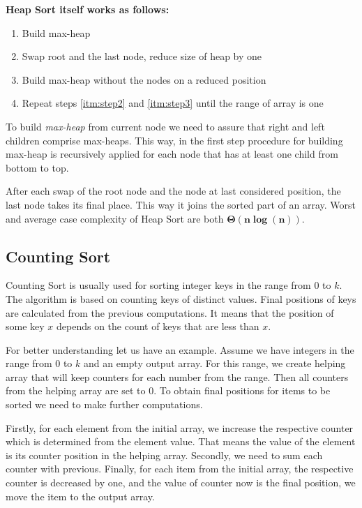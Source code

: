 \documentclass[
  field=inf,
  biblatex,
  language=english,
  glossaries,
  theorems=false,
  sourcecodes=false,
  index
]{kidiplom}
\begin{document}
\textbf{Heap Sort itself works as follows:}
\begin{enumerate}
 \item \label{itm:step1} Build max-heap
 \item \label{itm:step2} Swap root and the last node, reduce size of heap by one
 \item \label{itm:step3} Build max-heap without the nodes on a reduced position
 \item Repeat steps \ref{itm:step2} and \ref{itm:step3} until the range of array is one
\end{enumerate}

To build \textit{max-heap} from current node we need to assure that right and left children comprise max-heaps. This way, in the first step procedure for building max-heap is recursively applied for each node that has at least one child from bottom to top.

After each swap of the root node and the node at last considered position, the last node takes its final place. This way it joins the sorted part of an array. Worst and average case complexity of Heap Sort are both $\bm{\Theta(n \log(n))}$.

\subsection{Counting Sort} \label{sec:counting}

Counting Sort is usually used for sorting integer keys in the range from $0$ to $k$. The algorithm is based on counting keys of distinct values. Final positions of keys are calculated from the previous computations. It means that the position of some key $x$ depends on the count of keys that are less than $x$.

For better understanding let us have an example. Assume we have integers in the range from $0$ to $k$ and an empty output array. For this range, we create helping array that will keep counters for each number from the range. Then all counters from the helping array are set to $0$. To obtain final positions for items to be sorted we need to make further computations.

Firstly, for each element from the initial array, we increase the respective counter which is determined from the element value. That means the value of the element is its counter position in the helping array. Secondly, we need to sum each counter with previous. Finally, for each item from the initial array, the respective counter is decreased by one, and the value of counter now is the final position, we move the item to the output array.
\end{document}
